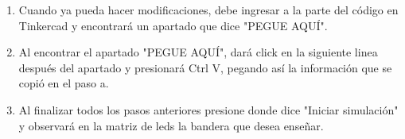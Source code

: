 \documentclass{article}
\begin{document}
\begin{enumerate}
\begin{enumerate}
       \item  Cuando ya pueda hacer modificaciones, debe ingresar a la parte del código en Tinkercad y encontrará un apartado que dice "PEGUE AQUÍ".\\

       \item Al encontrar el apartado "PEGUE AQUÍ", dará click en la siguiente linea después del apartado y presionará Ctrl V, pegando así la información que se copió en el paso a.\\
       
       \item Al finalizar todos los pasos anteriores presione donde dice "Iniciar simulación" y observará en la matriz de leds la bandera que desea enseñar.\\
       
         \end{enumerate}

    \end{enumerate}  
\end{document}
